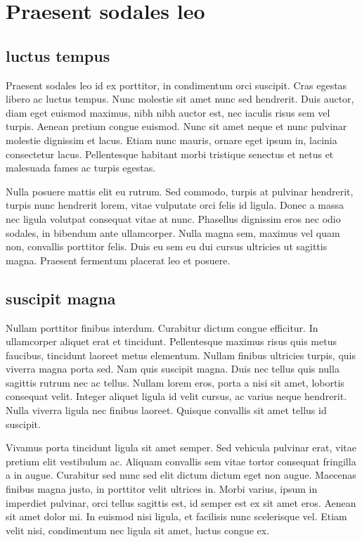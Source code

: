 \section{Praesent sodales leo}
\subsection{luctus tempus}
Praesent sodales leo id ex porttitor, in condimentum orci suscipit. 
Cras egestas libero ac luctus tempus. 
Nunc molestie sit amet nunc sed hendrerit. 
Duis auctor, diam eget euismod maximus, nibh nibh auctor est, nec iaculis risus sem vel turpis. 
Aenean pretium congue euismod. 
Nunc sit amet neque et nunc pulvinar molestie dignissim et lacus. 
Etiam nunc mauris, ornare eget ipsum in, lacinia consectetur lacus. 
Pellentesque habitant morbi tristique senectus et netus et malesuada fames ac turpis egestas.

Nulla posuere mattis elit eu rutrum. 
Sed commodo, turpis at pulvinar hendrerit, turpis nunc hendrerit lorem, vitae vulputate orci felis id ligula. 
Donec a massa nec ligula volutpat consequat vitae at nunc. 
Phasellus dignissim eros nec odio sodales, in bibendum ante ullamcorper. 
Nulla magna sem, maximus vel quam non, convallis porttitor felis. 
Duis eu sem eu dui cursus ultricies ut sagittis magna. 
Praesent fermentum placerat leo et posuere.

\subsection{suscipit magna}
Nullam porttitor finibus interdum. 
Curabitur dictum congue efficitur. 
In ullamcorper aliquet erat et tincidunt. 
Pellentesque maximus risus quis metus faucibus, tincidunt laoreet metus elementum. 
Nullam finibus ultricies turpis, quis viverra magna porta sed. 
Nam quis suscipit magna. 
Duis nec tellus quis nulla sagittis rutrum nec ac tellus. 
Nullam lorem eros, porta a nisi sit amet, lobortis consequat velit. 
Integer aliquet ligula id velit cursus, ac varius neque hendrerit. 
Nulla viverra ligula nec finibus laoreet. 
Quisque convallis sit amet tellus id suscipit.

Vivamus porta tincidunt ligula sit amet semper. 
Sed vehicula pulvinar erat, vitae pretium elit vestibulum ac. 
Aliquam convallis sem vitae tortor consequat fringilla a in augue. 
Curabitur sed nunc sed elit dictum dictum eget non augue. 
Maecenas finibus magna justo, in porttitor velit ultrices in. 
Morbi varius, ipsum in imperdiet pulvinar, orci tellus sagittis est, id semper est ex sit amet eros. 
Aenean sit amet dolor mi. 
In euismod nisi ligula, et facilisis nunc scelerisque vel. 
Etiam velit nisi, condimentum nec ligula sit amet, luctus congue ex.

